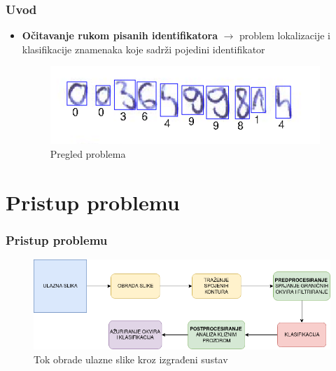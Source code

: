 \documentclass{beamer}
\begin{document}
\begin{frame}
	\frametitle{Uvod}
	\begin{itemize}
		\item \textbf{Očitavanje rukom pisanih identifikatora} $\rightarrow$ problem lokalizacije i klasifikacije znamenaka koje sadrži pojedini identifikator
			\begin{figure}[h]
			\centering
			\includegraphics[scale=1.0]{uvod.png}
			\caption{Pregled problema}
		\end{figure}
	\end{itemize}
\end{frame}

\section{Pristup problemu}

\begin{frame}
	\frametitle{Pristup problemu}
	\begin{figure}[h]
		\centering
		\includegraphics[scale=0.45]{system_arhitecture.png}
		\caption{Tok obrade ulazne slike kroz izgrađeni sustav}
	\end{figure}
\end{frame}
\end{document}
